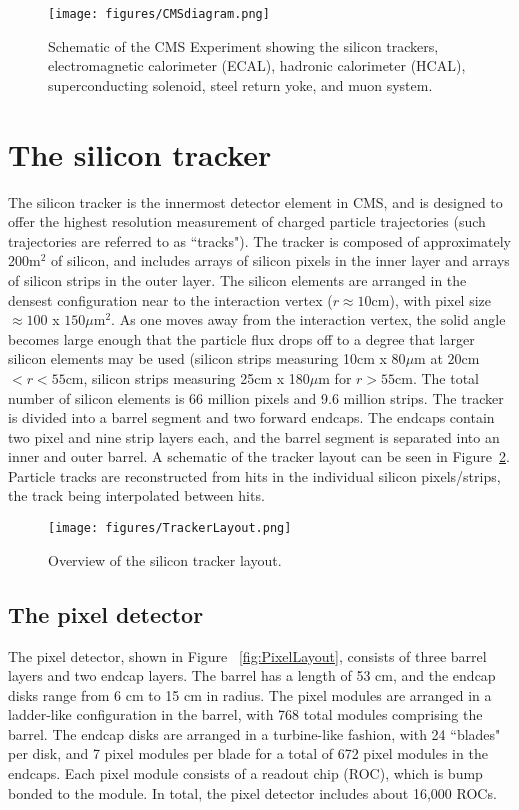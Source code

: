 \begin{figure}\centering
  \texttt{[image: figures/CMSdiagram.png]}
  \caption{\label{fig:CMSdiagram} Schematic of the CMS Experiment showing the silicon trackers, electromagnetic calorimeter (ECAL), hadronic calorimeter (HCAL), superconducting solenoid, steel return yoke, and muon system.}
\end{figure}

\section{The silicon tracker}

The silicon tracker is the innermost detector element in CMS, and is designed to offer the highest resolution measurement of charged particle trajectories (such trajectories are referred to as ``tracks"). The tracker is composed of approximately 200m$^{2}$ of silicon, and includes arrays of silicon pixels in the inner layer and arrays of silicon strips in the outer layer. The silicon elements are arranged in the densest configuration near to the interaction vertex ($ r\approx 10$cm), with pixel size $\approx 100$ x $150 \mu$m$^{2}$. As one moves away from the interaction vertex, the solid angle becomes large enough that the particle flux drops off to a degree that larger silicon elements may be used (silicon strips measuring 10cm x 80$\mu$m at $20$cm$ < r < 55$cm, silicon strips measuring 25cm x 180$\mu$m for $r > 55$cm. The total number of silicon elements is 66 million pixels and 9.6 million strips.\cite{TDR} The tracker is divided into a barrel segment and two forward endcaps. The endcaps contain two pixel and nine strip layers each, and the barrel segment is separated into an inner and outer barrel. A schematic of the tracker layout can be seen in Figure~\ref{fig:TrackerLayout}. Particle tracks are reconstructed from hits in the individual silicon pixels/strips, the track being interpolated between hits.

\begin{figure}\centering
  \texttt{[image: figures/TrackerLayout.png]}
  \caption{\label{fig:TrackerLayout} Overview of the silicon tracker layout.}
\end{figure}


\subsection{The pixel detector}

The pixel detector, shown in Figure ~\ref{fig:PixelLayout}, consists of three barrel layers and two endcap layers. The barrel has a length of 53 cm, and the endcap disks range from 6 cm to 15 cm in radius. The pixel modules are arranged in a ladder-like configuration in the barrel, with 768 total modules comprising the barrel. The endcap disks are arranged in a turbine-like fashion, with 24 ``blades" per disk, and 7 pixel modules per blade for a total of 672 pixel modules in the endcaps.
Each pixel module consists of a readout chip (ROC), which is bump bonded to the module. In total, the pixel detector includes about 16,000 ROCs.\cite{TDR}

